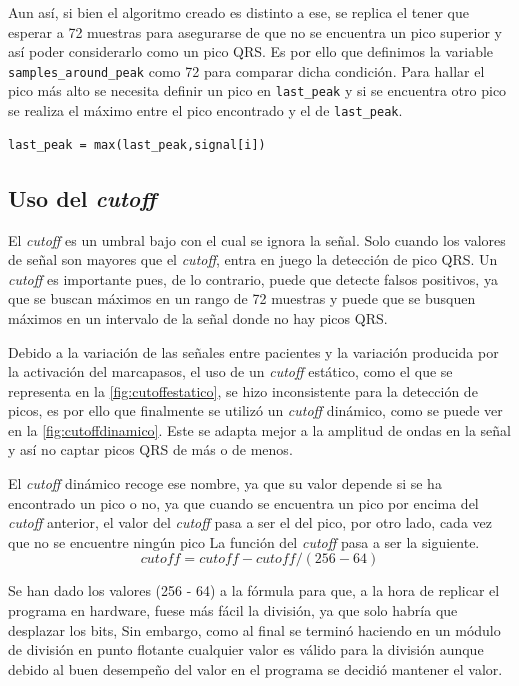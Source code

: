 Aun así, si bien el algoritmo creado es distinto a ese, se replica el tener que esperar a 72 muestras para asegurarse de que no se encuentra un pico superior y así poder considerarlo como un pico QRS. Es por ello que definimos la variable \lstinline|samples_around_peak| como 72 para comparar dicha condición. Para hallar el pico más alto se necesita definir un pico en \lstinline{last_peak} y si se encuentra otro pico se realiza el máximo entre el pico encontrado y el de \lstinline{last_peak}.

\lstset{language=python, breaklines=true, basicstyle=\footnotesize}
\begin{lstlisting}[frame=single]
last_peak = max(last_peak,signal[i])
\end{lstlisting}
\subsection{Uso del \textit{cutoff}}
El \textit{cutoff} es un umbral bajo con el cual se ignora la señal. Solo cuando los valores de señal son mayores que el \textit{cutoff}, entra en juego la detección de pico QRS. Un \textit{cutoff} es importante pues, de lo contrario, puede que detecte falsos positivos, ya que se buscan máximos en un rango de 72 muestras y puede que se busquen máximos en un intervalo de la señal donde no hay picos QRS.

Debido a la variación de las señales entre pacientes y la variación producida por la activación del marcapasos, el uso de un \textit{cutoff} estático, como el que se representa en la \cref{fig:cutoffestatico}, se hizo inconsistente para la detección de picos, es por ello que finalmente se utilizó un \textit{cutoff} dinámico, como se puede ver en la \cref{fig:cutoffdinamico}. Este se adapta mejor a la amplitud de ondas en la señal y así no captar picos QRS de más o de menos.

El \textit{cutoff} dinámico recoge ese nombre, ya que su valor depende si se ha encontrado un pico o no, ya que cuando se encuentra un pico por encima del \textit{cutoff} anterior, el valor del \textit{cutoff} pasa a ser el del pico, por otro lado, cada vez que no se encuentre ningún pico La función del \textit{cutoff} pasa a ser la siguiente.
\[cutoff = cutoff - cutoff/(256 - 64)\]

Se han dado los valores (256 - 64) a la fórmula para que, a la hora de replicar el programa en hardware, fuese más fácil la división, ya que solo habría que desplazar los bits, Sin embargo, como al final se terminó haciendo en un módulo de división en punto flotante cualquier valor es válido para la división aunque debido al buen desempeño del valor en el programa se decidió mantener el valor.

